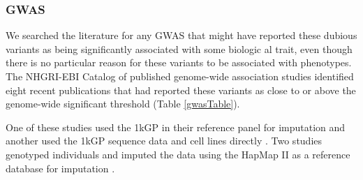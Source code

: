 \documentclass[9pt,lineno]{elife}
\begin{document}
\subsubsection{GWAS}

We searched the literature for any GWAS that might have reported these dubious variants as being significantly associated with some biologic al trait, even though there is no particular reason for these variants to be associated with phenotypes.
The NHGRI-EBI Catalog of published genome-wide association studies identified eight recent publications that had reported these variants as close to or above the genome-wide significant threshold (Table \ref{gwasTable}).

One of these studies used the 1kGP in their reference panel for imputation \citep{tian2017genome} and another used the 1kGP sequence data and cell lines directly \citep{Mandage2017}.
Two studies genotyped individuals and imputed the data using the HapMap II as a reference  database for imputation \citep{Kraja2011, Ebejer2013}.
\end{document}
